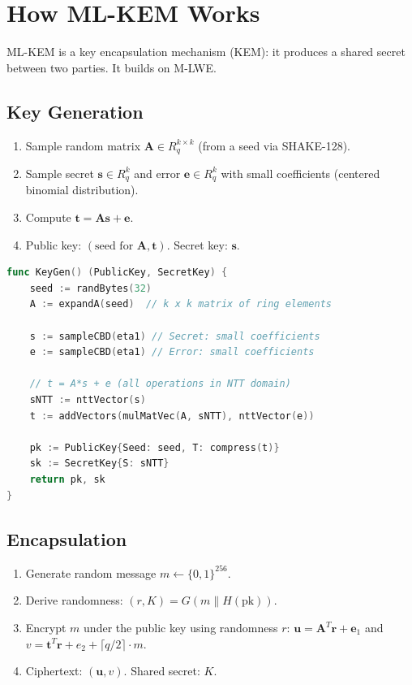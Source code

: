 \section{How ML-KEM Works}


ML-KEM is a key encapsulation mechanism (KEM): it produces a shared secret between two
parties. It builds on M-LWE.

\subsection{Key Generation}

\begin{enumerate}[nosep]
  \item Sample random matrix $\mathbf{A} \in R_q^{k \times k}$ (from a seed via SHAKE-128).
  \item Sample secret $\mathbf{s} \in R_q^k$ and error $\mathbf{e} \in R_q^k$ with small
    coefficients (centered binomial distribution).
  \item Compute $\mathbf{t} = \mathbf{A}\mathbf{s} + \mathbf{e}$.
  \item Public key: $(\text{seed for } \mathbf{A}, \mathbf{t})$. Secret key: $\mathbf{s}$.
\end{enumerate}

\begin{lstlisting}[language=Go,caption={ML-KEM key generation (simplified)}]
func KeyGen() (PublicKey, SecretKey) {
    seed := randBytes(32)
    A := expandA(seed)  // k x k matrix of ring elements

    s := sampleCBD(eta1) // Secret: small coefficients
    e := sampleCBD(eta1) // Error: small coefficients

    // t = A*s + e (all operations in NTT domain)
    sNTT := nttVector(s)
    t := addVectors(mulMatVec(A, sNTT), nttVector(e))

    pk := PublicKey{Seed: seed, T: compress(t)}
    sk := SecretKey{S: sNTT}
    return pk, sk
}
\end{lstlisting}

\subsection{Encapsulation}

\begin{enumerate}[nosep]
  \item Generate random message $m \gets \{0,1\}^{256}$.
  \item Derive randomness: $(r, K) = G(m \| H(\text{pk}))$.
  \item Encrypt $m$ under the public key using randomness $r$:
    $\mathbf{u} = \mathbf{A}^T \mathbf{r} + \mathbf{e}_1$ and
    $v = \mathbf{t}^T \mathbf{r} + e_2 + \lceil q/2 \rceil \cdot m$.
  \item Ciphertext: $(\mathbf{u}, v)$. Shared secret: $K$.
\end{enumerate}

